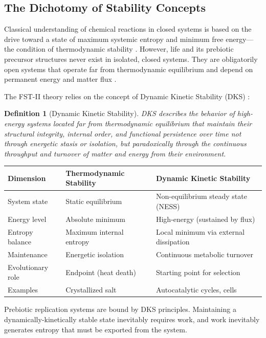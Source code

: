 \documentclass[12pt,a4paper]{article}
\newtheorem{definition}{Definition}
\theoremstyle{remark}
\begin{document}
\subsection{The Dichotomy of Stability Concepts}

Classical understanding of chemical reactions in closed systems is based on the drive toward a state of maximum systemic entropy and minimum free energy---the condition of thermodynamic stability \citep{StrategicPersistence}. However, life and its prebiotic precursor structures never exist in isolated, closed systems. They are obligatorily open systems that operate far from thermodynamic equilibrium and depend on permanent energy and matter flux \citep{Bioenergetics}.

The FST-II theory relies on the concept of Dynamic Kinetic Stability (DKS) \citep{StrategicPersistence}:

\begin{definition}[Dynamic Kinetic Stability]
DKS describes the behavior of high-energy systems located far from thermodynamic equilibrium that maintain their structural integrity, internal order, and functional persistence over time not through energetic stasis or isolation, but paradoxically through the continuous throughput and turnover of matter and energy from their environment.
\end{definition}

\begin{center}
\begin{tabular}{lll}
\toprule
\textbf{Dimension} & \textbf{Thermodynamic Stability} & \textbf{Dynamic Kinetic Stability} \\
\midrule
System state & Static equilibrium & Non-equilibrium steady state (NESS) \\
Energy level & Absolute minimum & High-energy (sustained by flux) \\
Entropy balance & Maximum internal entropy & Local minimum via external dissipation \\
Maintenance & Energetic isolation & Continuous metabolic turnover \\
Evolutionary role & Endpoint (heat death) & Starting point for selection \\
Examples & Crystallized salt & Autocatalytic cycles, cells \\
\bottomrule
\end{tabular}
\end{center}

Prebiotic replication systems are bound by DKS principles. Maintaining a dynamically-kinetically stable state inevitably requires work, and work inevitably generates entropy that must be exported from the system.
\end{document}
